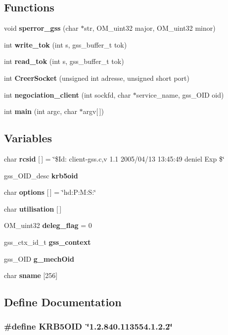 \subsection*{Functions}
\begin{CompactItemize}
\item 
void {\bf sperror\_\-gss} (char $\ast$str, OM\_\-uint32 major, OM\_\-uint32 minor)
\item 
int {\bf write\_\-tok} (int s, gss\_\-buffer\_\-t tok)
\item 
int {\bf read\_\-tok} (int s, gss\_\-buffer\_\-t tok)
\item 
int {\bf Creer\-Socket} (unsigned int adresse, unsigned short port)
\item 
int {\bf negociation\_\-client} (int sockfd, char $\ast$service\_\-name, gss\_\-OID oid)
\item 
int {\bf main} (int argc, char $\ast$argv[$\,$])
\end{CompactItemize}
\subsection*{Variables}
\begin{CompactItemize}
\item 
char {\bf rcsid} [$\,$] = \char`\"{}\$Id: client-gss.c,v 1.1 2005/04/13 13:45:49 deniel Exp \$\char`\"{}
\item 
gss\_\-OID\_\-desc {\bf krb5oid}
\item 
char {\bf options} [$\,$] = \char`\"{}hd:P:M:S:\char`\"{}
\item 
char {\bf utilisation} [$\,$]
\item 
OM\_\-uint32 {\bf deleg\_\-flag} = 0
\item 
gss\_\-ctx\_\-id\_\-t {\bf gss\_\-context}
\item 
gss\_\-OID {\bf g\_\-mech\-Oid}
\item 
char {\bf sname} [256]
\end{CompactItemize}


\subsection{Define Documentation}
\subsubsection{\setlength{\rightskip}{0pt plus 5cm}\#define KRB5OID\ \char`\"{}1.2.840.113554.1.2.2\char`\"{}}\label{client-gss_8c_a8}




